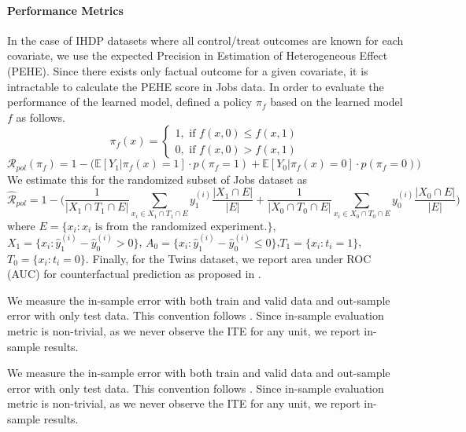 \documentclass{article}
\begin{document}
    \paragraph{Performance Metrics}
    In the case of IHDP datasets where all control/treat outcomes are known for each covariate, we use the expected Precision in Estimation of Heterogeneous Effect (PEHE). Since there exists only factual outcome for a given covariate, it is intractable to calculate the PEHE score in Jobs data. In order to evaluate the performance of the learned model, \cite{Shalit17} defined a policy $\pi_f$ based on the learned model $f$ as follows.
    \begin{equation}
        \pi_f(x) = \begin{cases}1, \text{ if }f(x,0) \le f(x,1)\\
        0, \text{ if }f(x,0) > f(x,1)
        \end{cases}
    \end{equation}
    \begin{equation}
     \mathcal{R}_{pol}(\pi_f) = 1- \Big( \mathbb{E}[Y_1|\pi_f(x)=1]\cdot p(\pi_f=1) + \mathbb{E}[Y_0|\pi_f(x)=0]\cdot p(\pi_f=0) \Big)
    \end{equation}
    We estimate this for the randomized subset of Jobs dataset as
    \begin{equation}
        \hat{\mathcal{R}}_{pol} = 1 - \Big( \frac{1}{|X_1 \cap T_1 \cap E|}\sum_{x_i \in X_1 \cap T_1 \cap E} y_1^{(i)} \frac{|X_1 \cap E|}{|E|} + \frac{1}{|X_0 \cap T_0 \cap E|}\sum_{x_i \in X_0 \cap T_0 \cap E} y_0^{(i)} \frac{|X_0 \cap E|}{|E|}  \Big)
    \end{equation}
    where $E=\{x_i : x_i \text{ is from the randomized experiment.}\}$, $X_1 = \{ x_i : \hat{y}_1^{(i)} - \hat{y}_0^{(i)} > 0 \}$, $A_0 = \{ x_i : \hat{y}_1^{(i)} - \hat{y}_0^{(i)} \le 0 \}$,$T_1 = \{ x_i : t_i =1 \}$, $T_0 = \{ x_i : t_i =0 \}$.
    Finally, for the Twins dataset, we report area under ROC (AUC) for counterfactual prediction as proposed in \cite{Louizos17}.
    
    We measure the in-sample error with both train and valid data and out-sample error with only test data. This convention follows \cite{johansson16, Shalit17, yao2018}. Since in-sample evaluation metric is non-trivial, as we never observe the ITE for any unit, we report in-sample results.
    
    We measure the in-sample error with both train and valid data and out-sample error with only test data. This convention follows \cite{johansson16, Shalit17, yao2018}. Since in-sample evaluation metric is non-trivial, as we never observe the ITE for any unit, we report in-sample results.
    
\end{document}
